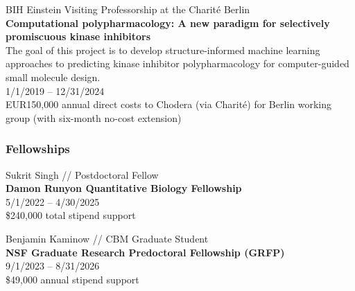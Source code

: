 \documentclass[10pt]{article}
\begin{document}

\vspace{1.5ex}

BIH Einstein Visiting Professorship at the Charit\'{e} Berlin\\
{\bf Computational polypharmacology: A new paradigm for selectively promiscuous kinase inhibitors}\\
The goal of this project is to develop structure-informed machine learning approaches to predicting kinase inhibitor polypharmacology for computer-guided small molecule design.\\
1/1/2019 -- 12/31/2024\\
EUR150,000 annual direct costs to Chodera (via Charit\'{e}) for Berlin working group (with six-month no-cost extension)

%

\vspace{-0.1in} 

\subsubsection*{Fellowships}

Sukrit Singh // Postdoctoral Fellow \\
{\bf Damon Runyon Quantitative Biology Fellowship}\\
5/1/2022 -- 4/30/2025\\
\$240,000 total stipend support

\vspace{1.5ex}

Benjamin Kaminow // CBM Graduate Student \\
{\bf NSF Graduate Research Predoctoral Fellowship (GRFP)}\\
9/1/2023 -- 8/31/2026\\
\$49,000 annual stipend support

\end{document}
